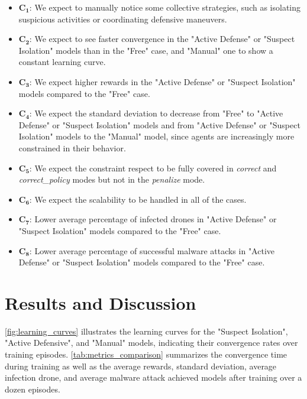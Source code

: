 \begin{itemize}
  \item $\mathbf{C_1}$: We expect to manually notice some collective strategies, such as isolating suspicious activities or coordinating defensive maneuvers.
  \item $\mathbf{C_2}$: We expect to see faster convergence in the "Active Defense" or "Suspect Isolation" models than in the "Free" case, and "Manual" one to show a constant learning curve.
  \item $\mathbf{C_3}$: We expect higher rewards in the "Active Defense" or "Suspect Isolation" models compared to the "Free" case.
  \item $\mathbf{C_{4}}$: We expect the standard deviation to decrease from "Free" to "Active Defense" or "Suspect Isolation" models and from "Active Defense" or "Suspect Isolation" models to the "Manual" model, since agents are increasingly more constrained in their behavior.
  \item $\mathbf{C_{5}}$: We expect the constraint respect to be fully covered in \textit{correct} and \textit{correct\_policy} modes but not in the \textit{penalize} mode.
  \item $\mathbf{C_{6}}$: We expect the scalability to be handled in all of the cases.
  \item $\mathbf{C_7}$: Lower average percentage of infected drones in "Active Defense" or "Suspect Isolation" models compared to the "Free" case.
  \item $\mathbf{C_8}$: Lower average percentage of successful malware attacks in "Active Defense" or "Suspect Isolation" models compared to the "Free" case.

\end{itemize}

\section{Results and Discussion}\label{sec:results_and_discussion}

\autoref{fig:learning_curves} illustrates the learning curves for the "Suspect Isolation", "Active Defensive", and "Manual" models, indicating their convergence rates over training episodes.
\autoref{tab:metrics_comparison} summarizes the convergence time during training as well as the average rewards, standard deviation, average infection drone, and average malware attack achieved models after training over a dozen episodes.

